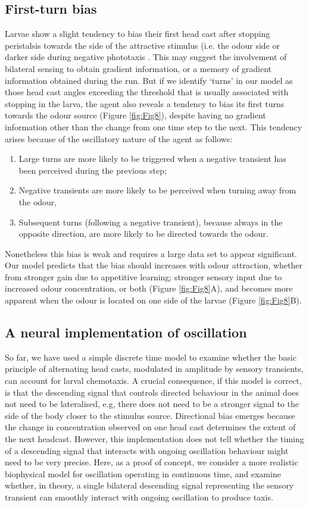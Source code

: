 \documentclass[10pt,a4paper]{article}
\begin{document}
\subsection{First-turn bias}
Larvae show a slight tendency to bias their first head cast after stopping peristalsis towards the side of the attractive stimulus (i.e. the odour side  or darker side during negative phototaxis \citep{kane2013sensorimotor}. This may suggest the involvement of bilateral sensing to obtain gradient information, or a memory of gradient information obtained during the run. But if we identify ‘turns’ in our model as those head cast angles exceeding the threshold that is usually associated with stopping in the larva, the agent also reveals a tendency to bias its first turns towards the odour source (Figure \ref{fig:Fig8}), despite having no gradient information other than the change from one time step to the next. This tendency arises because of the oscillatory nature of the agent as follows:
\begin{enumerate}
\item Large turns are more likely to be triggered when a negative transient has been perceived during the previous step; 
\item Negative transients are more likely to be perceived when turning away from the odour, 
\item Subsequent turns (following a negative transient), because always in the opposite direction, are more likely to be directed towards the odour. 
\end{enumerate}
Nonetheless this bias is weak and requires a large data set to appear significant. Our model predicts that the bias should  increases with odour attraction, whether from stronger gain due to appetitive learning; stronger sensory input due to increased odour concentration, or both (Figure \ref{fig:Fig8}A), and becomes more apparent when the odour is located on one side of the larvae (Figure \ref{fig:Fig8}B).

\subsection{A neural implementation of oscillation}
So far, we have used a simple discrete time model to examine whether the basic principle of alternating head casts, modulated in amplitude by sensory transients, can account for larval chemotaxis. A crucial consequence, if this model is correct, is that the descending signal that controls directed behaviour in the animal does not need to be lateralised, e.g, there does not need to be a stronger signal to the side of the body closer to the stimulus source. Directional bias emerges because the change in concentration observed on one head cast determines the extent of the next headcast. However, this implementation does not tell whether the timing of a descending signal that interacts with ongoing oscillation behaviour might need to be very precise. Here, as a proof of concept, we consider a more realistic biophysical model for oscillation operating in continuous time, and examine whether, in theory, a single bilateral descending signal representing the sensory transient can smoothly interact with ongoing oscillation to produce taxis.
\end{document}
